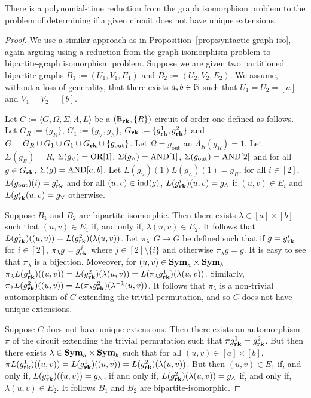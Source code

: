 \documentclass[../paper.tex]{subfiles}
\begin{document}
\begin{lem}
  There is a polynomial-time reduction from the graph isomorphism problem to the
  problem of determining if a given circuit does not have unique extensions.
  \label{lem:unique-extensions-hard}
\end{lem}
\begin{proof}
  We use a similar approach as in Proposition~\ref{prop:syntactic-graph-iso},
  again arguing using a reduction from the graph-isomorphism problem to
  bipartite-graph isomorphism problem. Suppose we are given two partitioned
  bipartite graphs $B_1 := (U_1, V_1, E_1)$ and $B_2 := (U_2, V_2, E_2)$. We
  assume, without a loss of generality, that there exists $a, b \in \mathbb{N}$ such
  that $U_1 = U_2 = [a]$ and $V_1 = V_2 = [b]$.

  Let $C := \langle G, \Omega, \Sigma, \Lambda, L \rangle$ be a $(\mathbb{B}_{\text{\textbf{rk}}},
  \{R\})$-circuit of order one defined as follows. Let $G_R := \{g_R\}$, $G_1 :=
  \{ g_{\lor}, g_{\land} \}$, $G_{\text{\textbf{rk}}} := \{ g^1_{\text{\textbf{rk}}}, g^2_{\text{\textbf{rk}}} \}$ and
  $G = G_R \cup G_1 \cup G_1 \cup G_{\text{\textbf{rk}}} \cup \{ g_{\text{out}} \}$. Let
  $\Omega = g_{\text{out}}$ an $\Lambda_R (g_R) = 1$. Let $\Sigma (g_R) = R$,
  $\Sigma (g_\lor) = \text{\upshape OR}[1]$, $\Sigma (g_\land) = \text{\upshape AND}[1]$, $\Sigma
  (g_{\text{out}}) = \text{\upshape AND}[2]$ and for all $g \in G_{\text{\textbf{rk}}}$, $\Sigma (g) =
  \text{\upshape AND}[a,b]$. Let $L(g_\lor)(1) L(g_\land)(1) = g_R$, for all $i \in [2]$,
  $L(g_{\text{out}})(i) = g^i_{\text{\textbf{rk}}}$ and for all $(u, v) \in \text{\upshape ind}(g)$,
  $L(g^i_{\text{\textbf{rk}}})(u,v) = g_{\land}$ if $(u, v) \in E_i$ and $L(g^i_{\text{\textbf{rk}}} (u,v)
  = g_{\lor}$ otherwise.

  Suppose $B_1$ and $B_2$ are bipartite-isomorphic. Then there exists $\lambda
  \in [a] \times [b]$ such that $(u,v) \in E_1$ if, and only if, $\lambda (u,v)
  \in E_2$. It follows that $L(g^1_{\text{\textbf{rk}}})((u,v)) =
  L(g^2_{\text{\textbf{rk}}})(\lambda(u,v))$. Let $\pi_{\lambda}: G \rightarrow G$ be defined
  such that if $g = g^i_{\text{\textbf{rk}}}$ for $i \in [2]$, $\pi_{\lambda} g =
  g^j_{\text{\textbf{rk}}}$ where $j \in [2] \setminus \{i\}$ and otherwise $\pi_{\lambda} g
  = g$. It is easy to see that $\pi_{\lambda}$ is a bijection. Moveover, for
  $(u,v) \in \text{\textbf{Sym}}_a \times \text{\textbf{Sym}}_b$ $\pi_{\lambda} L(g^1_{\text{\textbf{rk}}})((u,v)) =
  L(g^2_{\text{\textbf{rk}}})(\lambda (u,v)) = L(\pi_\lambda g^1_{\text{\textbf{rk}}})(\lambda (u,v))$.
  Similarly, $\pi_\lambda L(g^2_{\text{\textbf{rk}}})((u,v)) =
  L(\pi_{\lambda}g^2_{\text{\textbf{rk}}})(\lambda^{-1}(u,v))$. It follows that $\pi_\lambda$
  is a non-trivial automorphism of $C$ extending the trivial permutation, and so
  $C$ does not have unique extensions.

  Suppose $C$ does not have unique extensions. Then there exists an automorphism
  $\pi$ of the circuit extending the trivial permutation such that $\pi
  g^1_{\text{\textbf{rk}}} = g^2_{\text{\textbf{rk}}}$. But then there exists $\lambda \in \text{\textbf{Sym}}_a \times
  \text{\textbf{Sym}}_b$ such that for all $(u,v) \in [a]\times [b]$, $\pi
  L(g^1_{\text{\textbf{rk}}})((u,v)) = L(g^1_{\text{\textbf{rk}}})((u,v)) = L(g^2_{\text{\textbf{rk}}})(\lambda
  (u,v))$. But then $(u,v) \in E_1$ if, and only if, $L(g^1_{\text{\textbf{rk}}})((u,v)) =
  g_{\land}$, if and only if, $L(g^2_{\text{\textbf{rk}}})(\lambda(u,v)) = g_{\land}$ if, and
  only if, $\lambda (u,v) \in E_2$. It follows $B_1$ and $B_2$ are
  bipartite-isomorphic.
\end{proof}
\end{document}
